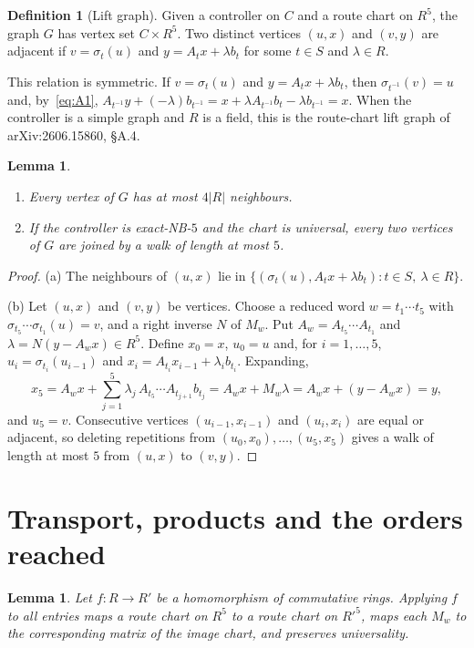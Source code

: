 \documentclass[11pt]{article}
\newtheorem{lemma}[theorem]{Lemma}
\theoremstyle{definition}
\newtheorem{definition}[theorem]{Definition}
\theoremstyle{remark}
\begin{document}
\begin{definition}[Lift graph]
Given a controller on $C$ and a route chart on $R^5$, the graph $G$ has vertex
set $C\times R^5$. Two distinct vertices $(u,x)$ and $(v,y)$ are adjacent if
$v=\sigma_t(u)$ and $y=A_tx+\lambda b_t$ for some $t\in S$ and $\lambda\in R$.
\end{definition}

This relation is symmetric. If $v=\sigma_t(u)$ and $y=A_tx+\lambda b_t$, then
$\sigma_{t^{-1}}(v)=u$ and, by~\eqref{eq:A1},
$A_{t^{-1}}y+(-\lambda)b_{t^{-1}}=x+\lambda A_{t^{-1}}b_t-\lambda b_{t^{-1}}=x$.
When the controller is a simple graph and $R$ is a field, this is the
route-chart lift graph of arXiv:2606.15860, \S A.4.

\begin{lemma}\label{lem:lift}
\begin{enumerate}[label=(\alph*)]
\item Every vertex of $G$ has at most $4|R|$ neighbours.
\item If the controller is exact-NB-$5$ and the chart is universal, every two
vertices of $G$ are joined by a walk of length at most $5$.
\end{enumerate}
\end{lemma}

\begin{proof}
(a) The neighbours of $(u,x)$ lie in
$\{(\sigma_t(u),A_tx+\lambda b_t): t\in S,\ \lambda\in R\}$.

(b) Let $(u,x)$ and $(v,y)$ be vertices. Choose a reduced word
$w=t_1\cdots t_5$ with $\sigma_{t_5}\cdots\sigma_{t_1}(u)=v$, and a right
inverse $N$ of $M_w$. Put $A_w=A_{t_5}\cdots A_{t_1}$ and
$\lambda=N(y-A_wx)\in R^5$. Define $x_0=x$, $u_0=u$ and, for
$i=1,\dots,5$, $u_i=\sigma_{t_i}(u_{i-1})$ and
$x_i=A_{t_i}x_{i-1}+\lambda_ib_{t_i}$. Expanding,
\[
  x_5=A_wx+\sum_{j=1}^5\lambda_j\,A_{t_5}\cdots A_{t_{j+1}}b_{t_j}
     =A_wx+M_w\lambda=A_wx+(y-A_wx)=y,
\]
and $u_5=v$. Consecutive vertices $(u_{i-1},x_{i-1})$ and $(u_i,x_i)$ are
equal or adjacent, so deleting repetitions from
$(u_0,x_0),\dots,(u_5,x_5)$ gives a walk of length at most $5$ from $(u,x)$
to $(v,y)$.
\end{proof}

\section{Transport, products and the orders reached}

\begin{lemma}\label{lem:transport}
Let $f\colon R\to R'$ be a homomorphism of commutative rings. Applying $f$ to
all entries maps a route chart on $R^5$ to a route chart on $R'^5$, maps each
$M_w$ to the corresponding matrix of the image chart, and preserves
universality.
\end{lemma}
\end{document}
